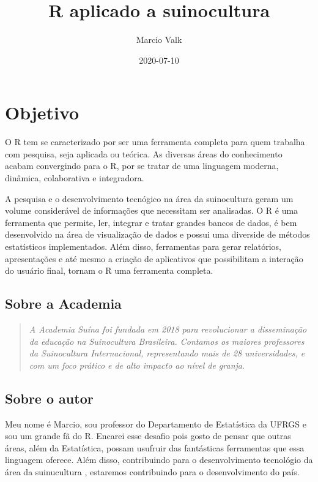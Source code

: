 \documentclass[
]{book}
\title{R aplicado a suinocultura}
\author{Marcio Valk}
\date{2020-07-10}
\begin{document}
\frontmatter
\maketitle

{
\setcounter{tocdepth}{1}
\tableofcontents
}
\mainmatter
\hypertarget{objetivo}{%
\chapter*{Objetivo}\label{objetivo}}

O R tem se caracterizado por ser uma ferramenta completa para quem trabalha com pesquisa, seja aplicada ou teórica. As diversas áreas do conhecimento acabam convergindo para o R, por se tratar de uma linguagem moderna, dinâmica, colaborativa e integradora.

A pesquisa e o desenvolvimento tecnógico na área da suinocultura geram um volume considerável de informações que necessitam ser analisadas. O R é uma ferramenta que permite, ler, integrar e tratar grandes bancos de dados, é bem desenvolvido na área de visualização de dados e possui uma diverside de métodos estatísticos implementados. Além disso, ferramentas para gerar relatórios, apresentações e até mesmo a criação de aplicativos que possibilitam a interação do usuário final, tornam o R uma ferramenta completa.

\hypertarget{sobre-a-academia}{%
\section*{Sobre a Academia}\label{sobre-a-academia}}

\begin{quote}
\emph{A Academia Suína foi fundada em 2018 para revolucionar a disseminação da educação na Suinocultura Brasileira. Contamos os maiores professores da Suinocultura Internacional, representando mais de 28 universidades, e com um foco prático e de alto impacto ao nível de granja}. \citep{academiasuina}
\end{quote}

\hypertarget{sobre-o-autor}{%
\section*{Sobre o autor}\label{sobre-o-autor}}

Meu nome é Marcio, sou professor do Departamento de Estatística da UFRGS e sou um grande fã do R. Encarei esse desafio pois gosto de pensar que outras áreas, além da Estatística, possam usufruir das fantásticas ferramentas que essa linguagem oferece. Além disso, contribuindo para o desenvolvimento tecnológio da área da suinucultura , estaremos contribuindo para o desenvolvimento do país.
\end{document}
